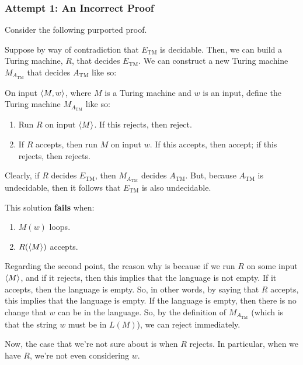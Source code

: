\documentclass[letterpaper]{article}
\begin{document}
\subsubsection{Attempt 1: An Incorrect Proof}
Consider the following purported proof. 
\begin{mdframed}[]
    Suppose by way of contradiction that $E_{\text{TM}}$ is decidable. Then, we can build a Turing machine, $R$, that decides $E_{\text{TM}}$. We can construct a new Turing machine $M_{A_{\text{TM}}}$ that decides $A_{\text{TM}}$ like so: 
    \begin{mdframed}[]
        On input $\langle M, w \rangle$, where $M$ is a Turing machine and $w$ is an input, define the Turing machine $M_{A_{\text{TM}}}$ like so: 

        \begin{enumerate}
            \item Run $R$ on input $\langle M \rangle$. If this rejects, then reject. 
            \item If $R$ accepts, then run $M$ on input $w$. If this accepts, then accept; if this rejects, then rejects. 
        \end{enumerate}
    \end{mdframed}
    Clearly, if $R$ decides $E_{\text{TM}}$, then $M_{A_{\text{TM}}}$ decides $A_{\text{TM}}$. But, because $A_{\text{TM}}$ is undecidable, then it follows that $E_{\text{TM}}$ is also undecidable. 
\end{mdframed}
This solution \textbf{fails} when: 
\begin{enumerate}
    \item $M(w)$ loops. 
    \item $R(\langle M \rangle)$ accepts. 
\end{enumerate}
Regarding the second point, the reason why is because if we run $R$ on some input $\langle M \rangle$, and if it rejects, then this implies that the language is not empty. If it accepts, then the language is empty. So, in other words, by saying that $R$ accepts, this implies that the language is empty. If the language is empty, then there is no change that $w$ can be in the language. So, by the definition of $M_{A_{\text{TM}}}$ (which is that the string $w$ must be in $L(M)$), we can reject immediately. 

\bigskip 

Now, the case that we're not sure about is when $R$ rejects. In particular, when we have $R$, we're not even considering $w$. 
\end{document}
